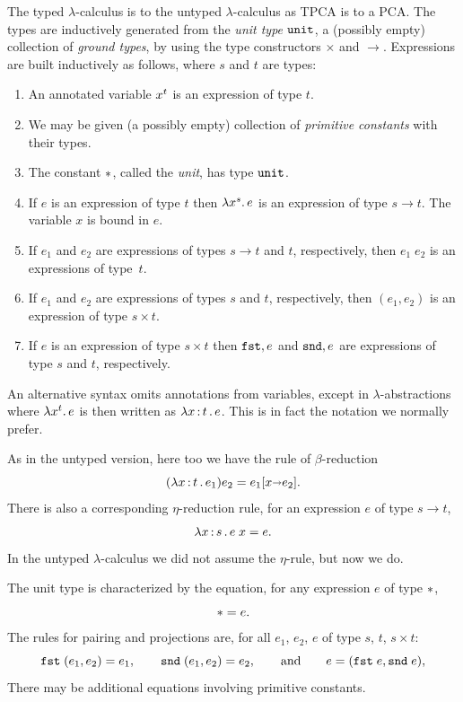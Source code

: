 The typed $\lambda$-calculus is to the untyped $\lambda$-calculus as
TPCA is to a PCA. The types are inductively generated from the
\emph{unit type $\mathtt{unit}$}, a (possibly empty) collection of
\emph{ground types}, by using the type constructors $\times$ and
$\to$. Expressions are built inductively as follows, where $s$ and $t$
are types:
%
\begin{enumerate}
\item An annotated variable $x^{t}$ is an expression of type
  $t$.
\item We may be given (a possibly empty) collection of \emph{primitive
  constants} with their types.
\item The constant ${*}$, called the \emph{unit}, has type
  $\mathtt{unit}$.
\item If $e$ is an expression of type $t$ then
  $\lambda x^{s} .\,e$ is an expression of type $s \to t$. The
  variable $x$ is bound in $e$.
\item If $e_1$ and $e_2$ are expressions of types $s \to t$ and
  $t$, respectively, then $e_1\; e_2$ is an expressions of type~$t$.
\item If $e_1$ and $e_2$ are expressions of types $s$ and $t$,
  respectively, then $(e_1, e_2)$ is an expression of type $s \times
  t$.
\item If $e$ is an expression of type $s \times t$ then $\mathtt{fst},e$ and
  $\mathtt{snd},e$ are expressions of type $s$ and $t$, respectively.
\end{enumerate}
%
An alternative syntax omits annotations from variables, except in
$\lambda$-abstractions where $\lambda x^{t} .\,e$ is then written
as $\lambda x \,{:}\, t\,.\,e$. This is in fact the notation we normally prefer.

As in the untyped version, here too we have the rule of
$\beta$-reduction
%
\begin{equation*}
  (\lambda x \,{:}\, t\,.\,e_1) e_2 = e_1[x {\shortrightarrow} e_2].
\end{equation*}
%
There is also a corresponding $\eta$-reduction rule, for an expression
$e$ of type $s \to t$,
%
\begin{equation*}
  \lambda x \,{:}\, s\,.\,e\;x = e.
\end{equation*}
%
In the untyped $\lambda$-calculus we did not assume the $\eta$-rule,
but now we do.

The unit type is characterized by the equation, for any expression $e$
of type ${*}$,
%
\begin{equation*}
  {*} = e.
\end{equation*}
%
The rules for pairing and projections are, for all $e_1$, $e_2$, $e$
of type $s$, $t$, $s \times t$:
%
\begin{equation*}
  \mathtt{fst}\;(e_1, e_2) = e_1,
  \qquad
  \mathtt{snd}\;(e_1, e_2) = e_2,
  \qquad\text{and}\qquad
  e = (\mathtt{fst}\;e, \mathtt{snd}\;e),
\end{equation*}
%
There may be additional equations involving primitive constants.

